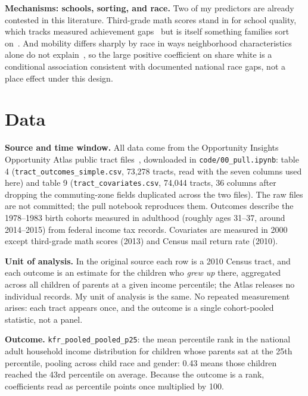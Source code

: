 \documentclass[9pt,twoside]{pnas-new}
\begin{document}
\noindent\textbf{Mechanisms: schools, sorting, and race.} Two of my predictors are
already contested in this literature. Third-grade math scores stand in for
school quality, which tracks measured achievement
gaps~\cite{reardon2011,hanushek2006} but is itself something families sort
on~\cite{reardonbischoff2011}. And mobility differs sharply by race in ways
neighborhood characteristics alone do not explain~\cite{chetty2020race}, so
the large positive coefficient on share white is a conditional association
consistent with documented national race gaps, not a place effect under this
design.

\section{Data}

\noindent\textbf{Source and time window.} All data come from the Opportunity
Insights Opportunity Atlas public tract files~\cite{chetty2018atlas},
downloaded in \texttt{code/00\_pull.ipynb}: table 4
(\texttt{tract\_outcomes\_simple.csv}, 73{,}278 tracts, read with the seven
columns used here) and table 9 (\texttt{tract\_covariates.csv}, 74{,}044
tracts, 36 columns after dropping the commuting-zone fields duplicated across
the two files). The raw files are not committed; the pull notebook reproduces
them. Outcomes describe the 1978--1983 birth cohorts measured in
adulthood (roughly ages 31--37, around 2014--2015) from federal income tax
records. Covariates are measured in 2000 except third-grade math scores (2013)
and Census mail return rate (2010).

\noindent\textbf{Unit of analysis.} In the original source each row is a 2010 Census
tract, and each outcome is an estimate for the children who \emph{grew up}
there, aggregated across all children of parents at a given income percentile;
the Atlas releases no individual records. My unit of analysis is the same. No
repeated measurement arises: each tract appears once, and the outcome is a
single cohort-pooled statistic, not a panel.

\noindent\textbf{Outcome.} \texttt{kfr\_pooled\_pooled\_p25}: the mean percentile
rank in the national adult household income distribution for children whose
parents sat at the 25th percentile, pooling across child race and gender: 0.43
means those children reached the 43rd percentile on average. Because the
outcome is a rank, coefficients read as percentile points once multiplied by
100.
\end{document}
